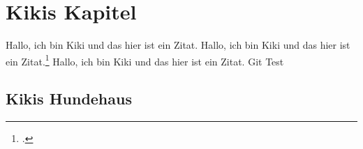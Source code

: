 \maketitle

\chapter{Kikis Kapitel}
Hallo, ich bin Kiki und das hier ist ein Zitat.\autocite{seiter2017business}
Hallo, ich bin Kiki und das hier ist ein Zitat.\footcite{seiter2017business}
Hallo, ich bin Kiki und das hier ist ein Zitat.\citeauthor{seiter2017business}
Git Test
\section{Kikis Hundehaus}


\printbibliography[nottype=online] 
\printbibliography[type=online, title={Internetquellen}] 
